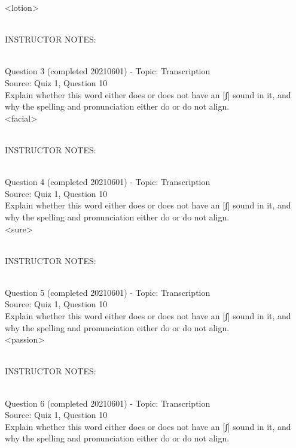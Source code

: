 \documentclass[12pt]{article}
\begin{document}
<lotion>


~\\
INSTRUCTOR NOTES: 


~\\

{\large Question 3} (completed 20210601) - Topic: Transcription\\
Source: Quiz 1, Question 10\\

Explain whether this word either does or does not have an [ʃ] sound in it, and why the spelling and pronunciation either do or do not align.\\

<facial>


~\\
INSTRUCTOR NOTES: 


~\\

{\large Question 4} (completed 20210601) - Topic: Transcription\\
Source: Quiz 1, Question 10\\

Explain whether this word either does or does not have an [ʃ] sound in it, and why the spelling and pronunciation either do or do not align.\\

<sure>


~\\
INSTRUCTOR NOTES: 


~\\

{\large Question 5} (completed 20210601) - Topic: Transcription\\
Source: Quiz 1, Question 10\\

Explain whether this word either does or does not have an [ʃ] sound in it, and why the spelling and pronunciation either do or do not align.\\

<passion>


~\\
INSTRUCTOR NOTES: 


~\\

{\large Question 6} (completed 20210601) - Topic: Transcription\\
Source: Quiz 1, Question 10\\

Explain whether this word either does or does not have an [ʃ] sound in it, and why the spelling and pronunciation either do or do not align.\\
\end{document}
